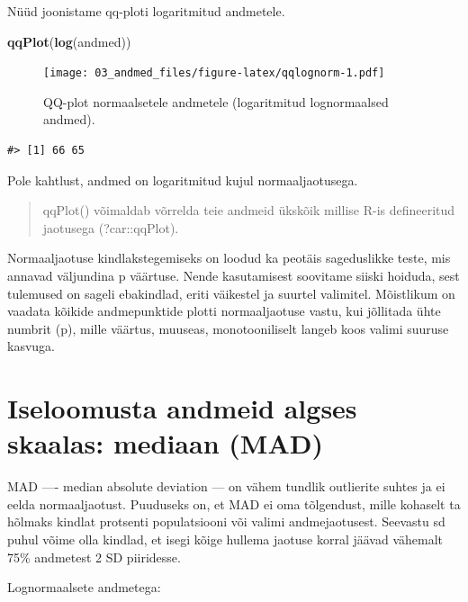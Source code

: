 \documentclass[]{book}
\newenvironment{Shaded}{\begin{snugshade}}{\end{snugshade}}
\newcommand{\KeywordTok}[1]{\textcolor[rgb]{0.13,0.29,0.53}{\textbf{#1}}}
\newcommand{\NormalTok}[1]{#1}
\begin{document}
Nüüd joonistame qq-ploti logaritmitud andmetele.




\begin{Shaded}
\begin{Highlighting}[]
\KeywordTok{qqPlot}\NormalTok{(}\KeywordTok{log}\NormalTok{(andmed))}
\end{Highlighting}
\end{Shaded}

\begin{figure}
\centering
\texttt{[image: 03\_andmed\_files/figure-latex/qqlognorm-1.pdf]}
\caption{\label{fig:qqlognorm}QQ-plot normaalsetele andmetele (logaritmitud
lognormaalsed andmed).}
\end{figure}

\begin{verbatim}
#> [1] 66 65
\end{verbatim}

Pole kahtlust, andmed on logaritmitud kujul normaaljaotusega.

\begin{quote}
qqPlot() võimaldab võrrelda teie andmeid ükskõik millise R-is
defineeritud jaotusega (?car::qqPlot).
\end{quote}

Normaaljaotuse kindlakstegemiseks on loodud ka peotäis sageduslikke
teste, mis annavad väljundina p väärtuse. Nende kasutamisest soovitame
siiski hoiduda, sest tulemused on sageli ebakindlad, eriti väikestel ja
suurtel valimitel. Mõistlikum on vaadata kõikide andmepunktide plotti
normaaljaotuse vastu, kui jõllitada ühte numbrit (p), mille väärtus,
muuseas, monotooniliselt langeb koos valimi suuruse kasvuga.

\section*{Iseloomusta andmeid algses skaalas: mediaan
(MAD)}\label{iseloomusta-andmeid-algses-skaalas-mediaan-mad}

MAD ---- median absolute deviation --- on vähem tundlik outlierite
suhtes ja ei eelda normaaljaotust. Puuduseks on, et MAD ei oma
tõlgendust, mille kohaselt ta hõlmaks kindlat protsenti populatsiooni
või valimi andmejaotusest. Seevastu sd puhul võime olla kindlad, et
isegi kõige hullema jaotuse korral jäävad vähemalt 75\% andmetest 2 SD
piiridesse.

Lognormaalsete andmetega:
\end{document}
